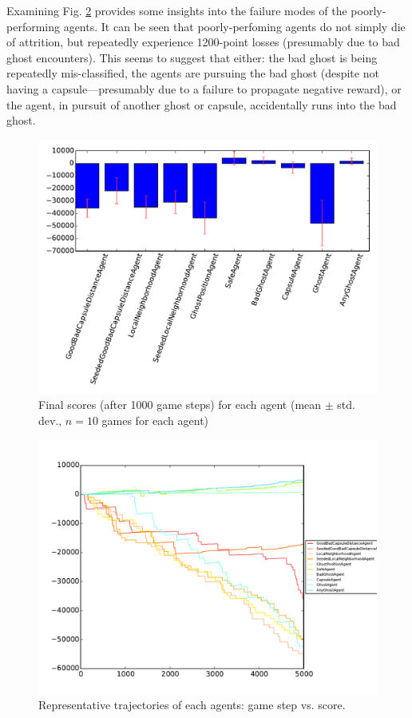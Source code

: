 \documentclass[11pt]{amsart}
\begin{document}
Examining Fig. \ref{fig:agents-trajectories} provides some insights into the failure modes of the poorly-performing agents. It can be seen that poorly-perfoming agents do not simply die of attrition, but repeatedly experience 1200-point losses (presumably due to bad ghost encounters). This seems to suggest that either: the bad ghost is being repeatedly mis-classified, the agents are pursuing the bad ghost (despite not having a capsule---presumably due to a failure to propagate negative reward), or the agent, in pursuit of another ghost or capsule, accidentally runs into the bad ghost.

\begin{figure}
	\includegraphics[width=\textwidth]{agents-finals.pdf}
	\caption{Final scores (after 1000 game steps) for each agent (mean $\pm$ std. dev., $n = 10$ games for each agent)}
	\label{fig:agents-finals}
\end{figure}

\begin{figure}
	\includegraphics[width=\textwidth]{agents-trajectories.pdf}
	\caption{Representative trajectories of each agents: game step vs. score.}
	\label{fig:agents-trajectories}
\end{figure}
\end{document}
